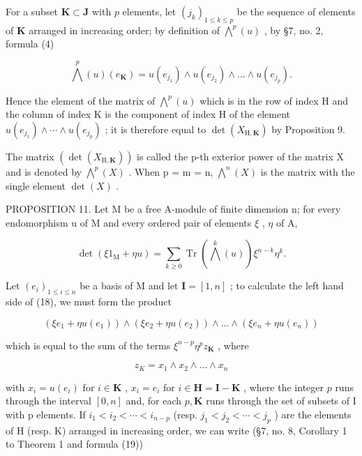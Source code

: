 For a subset \(\mathbf{K} \subset \mathbf{J}\) with \(p\) elements, let \((j_k)_{1 \leqslant k \leqslant p}\) be the sequence of elements of \(\mathbf{K}\) arranged in increasing order; by definition of \(\bigwedge^p(u)\) , by §7, no. 2, formula (4)

\[
\bigwedge^ {p} (u) \left(e _ {\mathbf {K}}\right) = u \left(e _ {j _ {1}}\right) \wedge u \left(e _ {j _ {2}}\right) \wedge \dots \wedge u \left(e _ {j _ {p}}\right).
\]

Hence the element of the matrix of \(\bigwedge^{p}(u)\) which is in the row of index H and the column of index K is the component of index H of the element \(u(e_{j_1}) \wedge \cdots \wedge u(e_{j_p})\) ; it is therefore equal to \(\det(X_{\mathrm{H},\mathbf{K}})\) by Proposition 9.

The matrix \((\det(X_{\mathrm{H},\mathbf{K}}))\) is called the p-th exterior power of the matrix X and is denoted by \(\bigwedge^{p}(X)\) . When p = m = n, \(\bigwedge^{n}(X)\) is the matrix with the single element \(\det(X)\) .

PROPOSITION 11. Let M be a free A-module of finite dimension n; for every endomorphism u of M and every ordered pair of elements \(\xi\) , \(\eta\) of A,

\[
\det (\xi 1 _ {\mathrm{M}} + \eta u) = \sum_ {k \geqslant 0} \operatorname{Tr} \left(\bigwedge^ {k} (u)\right) \xi^ {n - k} \eta^ {k}.\tag{18}
\]

Let \((e_i)_{1\leqslant i\leqslant n}\) be a basis of M and let \(\mathbf{I} = [1,n]\) ; to calculate the left hand side of (18), we must form the product

\[
\left(\xi e _ {1} + \eta u (e _ {1})\right) \wedge \left(\xi e _ {2} + \eta u (e _ {2})\right) \wedge \dots \wedge \left(\xi e _ {n} + \eta u (e _ {n})\right)
\]

which is equal to the sum of the terms \(\xi^{n - p}\eta^{p}z_{\mathbf{K}}\) , where

\[
z _ {K} = x _ {1} \wedge x _ {2} \wedge \dots \wedge x _ {n}
\]

with \(x_{i} = u(e_{i})\) for \(i \in \mathbf{K}\) , \(x_{i} = e_{i}\) for \(i \in \mathbf{H} = \mathbf{I} - \mathbf{K}\) , where the integer \(p\) runs through the interval \([0, n]\) and, for each \(p, \mathbf{K}\) runs through the set of subsets of I with p elements. If \(i_{1} < i_{2} < \cdots < i_{n-p}\) (resp. \(j_{1} < j_{2} < \cdots < j_{p}\) ) are the elements of H (resp. K) arranged in increasing order, we can write (§7, no. 8, Corollary 1 to Theorem 1 and formula (19))

